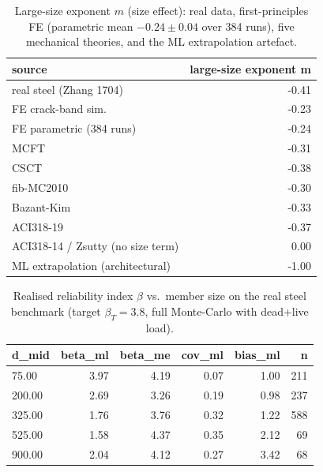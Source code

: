 \documentclass[11pt]{article}
\begin{document}
\begin{table}[h]\centering\small
\caption{Large-size exponent $m$ (size effect): real data, first-principles FE (parametric mean $-0.24\pm0.04$ over 384 runs), five mechanical theories, and the ML extrapolation artefact.}\label{tab:s5}
\begin{tabular}{lr}
\toprule
\textbf{source} & \textbf{large-size exponent m} \\
\midrule
real steel (Zhang 1704) & -0.41 \\
FE crack-band sim. & -0.23 \\
FE parametric (384 runs) & -0.24 \\
MCFT & -0.31 \\
CSCT & -0.38 \\
fib-MC2010 & -0.30 \\
Bazant-Kim & -0.33 \\
ACI318-19 & -0.37 \\
ACI318-14 / Zsutty (no size term) & 0.00 \\
ML extrapolation (architectural) & -1.00 \\
\bottomrule
\end{tabular}
\end{table}

\begin{table}[h]\centering\small
\caption{Realised reliability index $\beta$ vs.\ member size on the real steel benchmark (target $\beta_T=3.8$, full Monte-Carlo with dead+live load).}\label{tab:s6}
\begin{tabular}{lrrrrr}
\toprule
\textbf{d\_mid} & \textbf{beta\_ml} & \textbf{beta\_me} & \textbf{cov\_ml} & \textbf{bias\_ml} & \textbf{n} \\
\midrule
75.00 & 3.97 & 4.19 & 0.07 & 1.00 & 211 \\
200.00 & 2.69 & 3.26 & 0.19 & 0.98 & 237 \\
325.00 & 1.76 & 3.76 & 0.32 & 1.22 & 588 \\
525.00 & 1.58 & 4.37 & 0.35 & 2.12 & 69 \\
900.00 & 2.04 & 4.12 & 0.27 & 3.42 & 68 \\
\bottomrule
\end{tabular}
\end{table}
\end{document}
